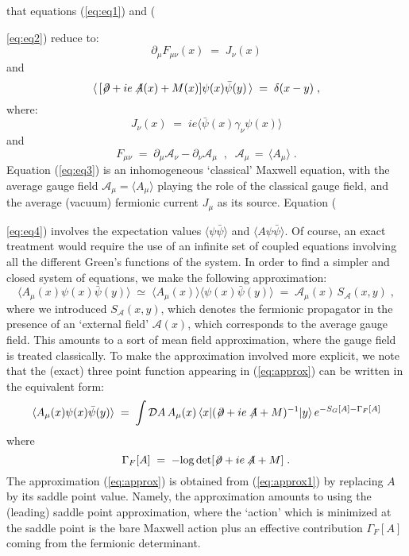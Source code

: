 \documentclass[a4paper,12pt]{article}
\begin{document}
that equations (\ref{eq:eq1}) and ({\ref{eq:eq2}) reduce to:
\begin{equation}
   \label{eq:eq3}
\partial_\mu F_{\mu\nu}(x) \;=\; J_\nu(x)
\end{equation}
and
\begin{equation}
   \label{eq:eq4}
\langle \, [\not\! \partial + i e \not \!\!A(x) + M(x)]
\psi(x) {\bar\psi}(y) \, \rangle \;=\; \delta (x-y) \;,
\end{equation}
where:
\begin{equation}
   \label{eq:defJ}
J_\nu(x)  \;=\;  i e \langle {\bar \psi}(x) \gamma_\nu \psi(x) \rangle
\end{equation}
and
\begin{equation}
   \label{eq:deff}
F_{\mu\nu}\;=\; \partial_\mu {\mathcal A}_\nu - \partial_\nu {\mathcal A}_\mu\;\;,\;\; {\mathcal A}_\mu
\,=\,\langle A_\mu\rangle \;.
\end{equation}
Equation (\ref{eq:eq3}) is an inhomogeneous `classical' Maxwell
equation, with the average gauge field \mbox{${\mathcal A}_\mu =
  \langle A_\mu \rangle$} playing the role of the classical gauge
field, and the average (vacuum) fermionic current $J_\mu$ as its
source.  Equation ({\ref{eq:eq4}) involves the expectation values
  \mbox{$\langle \psi {\bar\psi}\rangle$} and {$\langle A \psi
    {\bar\psi}\rangle$}. Of course, an exact treatment would require
  the use of an infinite set of coupled equations involving all the
  different Green's functions of the system.  In order to find a
  simpler and closed system of equations, we make the following
  approximation:
\begin{equation}
   \label{eq:approx}
\langle A_\mu (x) \psi(x) {\bar\psi}(y) \rangle \;\simeq\; \langle A_\mu (x)
\rangle \langle \psi (x) {\bar\psi} (y) \rangle \;=\;
{\mathcal A}_\mu(x) \, S_{\mathcal A}(x,y) \;,
\end{equation}
where we introduced $S_{\mathcal A}(x,y)$, which denotes the fermionic
propagator in the presence of an `external field' ${\mathcal A}(x)$,
which corresponds to the average gauge field.  This amounts to a sort
of mean field approximation, where the gauge field is treated
classically. To make the approximation involved more explicit, we note
that the (exact) three point function appearing in (\ref{eq:approx})
can be written in the equivalent form:
\begin{equation}
   \label{eq:approx1}
\langle A_\mu (x) \psi(x) {\bar\psi}(y) \rangle \;=\; \int {\mathcal D}A
\,A_\mu (x)\, \langle x |( \not \! \partial + i e \not \!\! A + M )^{-1}| y \rangle
\, e^{- S_G[A] - \Gamma_F [A]}
\end{equation}
where
\begin{equation}
   \label{eq:defgf}
\Gamma_F [A] \;=\; - {\rm log}\det[\not\!\partial + i e \not \!\! A + M ]\;.
\end{equation}
The approximation (\ref{eq:approx}) is obtained from
(\ref{eq:approx1}) by replacing $A$ by its saddle point value. Namely,
the approximation amounts to using the (leading) saddle point
approximation, where the `action' which is minimized at the saddle
point is the bare Maxwell action plus an effective contribution
$\Gamma_F[A]$ coming from the fermionic determinant.

}}
\end{document}
